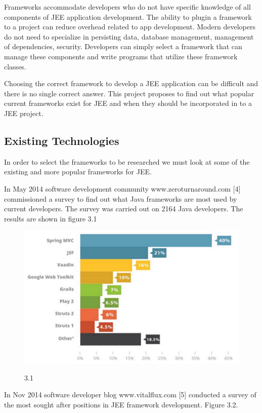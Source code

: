 Frameworks accommodate developers who do not have specific knowledge of all components of JEE application development. The ability to plugin a framework to a project can reduce overhead related to app development. Modern developers do not need to specialize in persisting data, database management, management of dependencies, security. Developers can simply select a framework that can manage these components and write programs that utilize these framework classes.

Choosing the correct framework to develop a JEE application can be difficult and there is no single correct answer. This project proposes to find out what popular current frameworks exist for JEE and when they should be incorporated in to a JEE project. 

\newpage

\subsection{Existing Technologies}
In order to select the frameworks to be researched we must look at some of the existing and more popular frameworks for JEE. 

In May 2014 software development community www.zeroturnaround.com [4] commissioned a survey to find out what Java frameworks are most used by current developers. The survey was carried out on 2164 Java developers. The results are shown in figure 3.1

\begin{figure}[h]
	\includegraphics[width=.7\textwidth]{img11.png}
	\begin{center}
		\figurename{ 3.1}
	\end{center}
\end{figure}

In Nov 2014 software developer blog www.vitalflux.com [5] conducted a survey of the most sought after positions in JEE framework development. Figure 3.2.			

